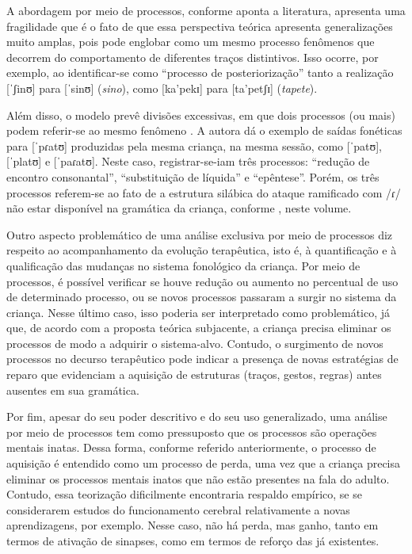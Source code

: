 \documentclass[output=paper,colorlinks,citecolor=brown,booklanguage=portuguese]{langscibook}
\begin{document}
A abordagem por meio de processos, conforme aponta a literatura, apresenta uma fragilidade que é o fato de que essa perspectiva teórica apresenta generalizações muito amplas, pois pode englobar como um mesmo processo fenômenos que decorrem do comportamento de diferentes traços distintivos. Isso ocorre, por exemplo, ao identificar-se como “processo de posteriorização” tanto a realização [ˈʃinʊ] para [ˈsinʊ] (\emph{sino}), como [ka'pekɪ] para [ta'petʃɪ] (\emph{tapete}).

Além disso, o modelo prevê divisões excessivas, em que dois processos (ou mais) podem referir-se ao mesmo fenômeno \citep{Matzenauer2004}. A autora dá o exemplo de saídas fonéticas para [ˈpɾatʊ] produzidas pela mesma criança, na mesma sessão, como [ˈpatʊ], [ˈplatʊ] e [ˈpaɾatʊ]. Neste caso, registrar-se-iam três processos: “redução de encontro consonantal”, “substituição de líquida” e “epêntese”. Porém, os três processos referem-se ao fato de a estrutura silábica do ataque ramificado com /ɾ/ não estar disponível na gramática da criança, conforme , neste volume.

Outro aspecto problemático de uma análise exclusiva por meio de processos diz respeito ao acompanhamento da evolução terapêutica, isto é, à quantificação e à qualificação das mudanças no sistema fonológico da criança. Por meio de processos, é possível verificar se houve redução ou aumento no percentual de uso de determinado processo, ou se novos processos passaram a surgir no sistema da criança. Nesse último caso, isso poderia ser interpretado como problemático, já que, de acordo com a proposta teórica subjacente, a criança precisa eliminar os processos de modo a adquirir o sistema-alvo. Contudo, o surgimento de novos processos no decurso terapêutico pode indicar a presença de novas estratégias de reparo que evidenciam a aquisição de estruturas (traços, gestos, regras) antes ausentes em sua gramática.

Por fim, apesar do seu poder descritivo e do seu uso generalizado, uma análise por meio de processos tem como pressuposto que os processos são operações mentais inatas. Dessa forma, conforme referido anteriormente, o processo de aquisição é entendido como um processo de perda, uma vez que a criança precisa eliminar os processos mentais inatos que não estão presentes na fala do adulto. Contudo, essa teorização dificilmente encontraria respaldo empírico, se se considerarem estudos do funcionamento cerebral relativamente a novas aprendizagens, por exemplo. Nesse caso, não há perda, mas ganho, tanto em termos de ativação de sinapses, como em termos de reforço das já existentes.
\end{document}

